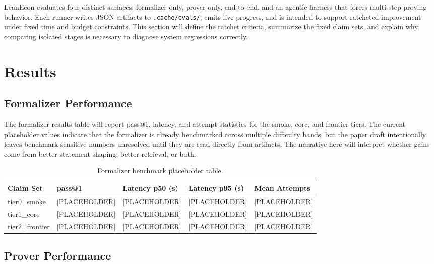 \documentclass[11pt,letterpaper]{article}
\begin{document}
LeanEcon evaluates four distinct surfaces: formalizer-only, prover-only, end-to-end, and an agentic harness that forces multi-step proving behavior. Each runner writes JSON artifacts to \texttt{.cache/evals/}, emits live progress, and is intended to support ratcheted improvement under fixed time and budget constraints. This section will define the ratchet criteria, summarize the fixed claim sets, and explain why comparing isolated stages is necessary to diagnose system regressions correctly.

\section{Results}

\subsection{Formalizer Performance}

The formalizer results table will report pass@1, latency, and attempt statistics for the smoke, core, and frontier tiers. The current placeholder values indicate that the formalizer is already benchmarked across multiple difficulty bands, but the paper draft intentionally leaves benchmark-sensitive numbers unresolved until they are read directly from artifacts. The narrative here will interpret whether gains come from better statement shaping, better retrieval, or both.

\begin{table}[h]
\centering
\begin{tabular}{lllll}
\toprule
Claim Set & pass@1 & Latency p50 (s) & Latency p95 (s) & Mean Attempts \\
\midrule
tier0\_smoke & [PLACEHOLDER] & [PLACEHOLDER] & [PLACEHOLDER] & [PLACEHOLDER] \\
tier1\_core & [PLACEHOLDER] & [PLACEHOLDER] & [PLACEHOLDER] & [PLACEHOLDER] \\
tier2\_frontier & [PLACEHOLDER] & [PLACEHOLDER] & [PLACEHOLDER] & [PLACEHOLDER] \\
\bottomrule
\end{tabular}
\caption{Formalizer benchmark placeholder table.}
\end{table}

\subsection{Prover Performance}
\end{document}
